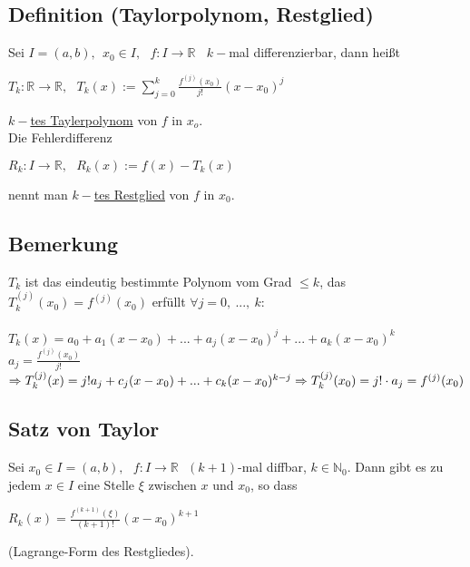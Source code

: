 \documentclass[a4paper, 12pt,titlepage, pdf, headsepline]{scrartcl}
\newcommand{\R}{\mathds{R}}
\newcommand{\N}{\mathds{N}}
\newcommand{\uline}[1]{\underline{#1}}
\renewcommand{\>}{\rightarrow}
\renewcommand{\*}{\cdot}
\begin{document}
\subsection{Definition (Taylorpolynom, Restglied)}
Sei $I = (a,b),~~ x_0 \in I,~~~ f:I \rightarrow \R~~~~k-$mal differenzierbar, dann heißt \begin{center}
	$T_k :\R \rightarrow \R,~~~T_k(x) := \sum_{j = 0}^{k}\frac{f^{(j)} (x_0)}{j!}(x-x_0)^j$
\end{center}
\uline{$k-$tes Taylerpolynom} von $f$ in $x_o$. \\
Die Fehlerdifferenz \begin{center}
	$R_k: I \rightarrow \R,~~~ R_k(x) := f(x) - T_k(x)$
\end{center} nennt man \uline{$k-$tes Restglied} von $f$ in $x_0$. 
\subsection{Bemerkung}
$T_k$ ist das eindeutig bestimmte Polynom vom Grad $\leq k$, das $T_k^{(j)}(x_0) = f^{(j)}(x_0)$ erfüllt $\forall j = 0,~...,~k$:\\
\\
$T_k(x) = a_0 + a_1(x-x_0) + ... + a_j(x-x_0)^j + ... + a_k(x-x_0)^k$\\
$a_j = \frac{f^{(j)}(x_0)}{j!}$\\
$\Rightarrow T_k^{(j)}(x) = j!a_j + c_j(x-x_0) + ... + c_k(x-x_0)^{k-j}\\
\Rightarrow T_k^{(j)}(x_0) = j! \cdot a_j = f^{(j)}(x_0)$
\subsection{Satz von Taylor}
\label{12.3}
Sei $x_0 \in I =(a,b),~~~ f: I \rightarrow \R~~~(k+1)$-mal diffbar, $k \in \N_0$. Dann gibt es zu jedem $x \in I$ eine Stelle $\xi$ zwischen $x$ und $x_0$, so dass
\begin{center}
	$R_k(x) = \frac{f^{(k+1)}(\xi)}{(k+1)!} (x-x_0)^{k+1}$
\end{center}
(Lagrange-Form des Restgliedes).
\end{document}
